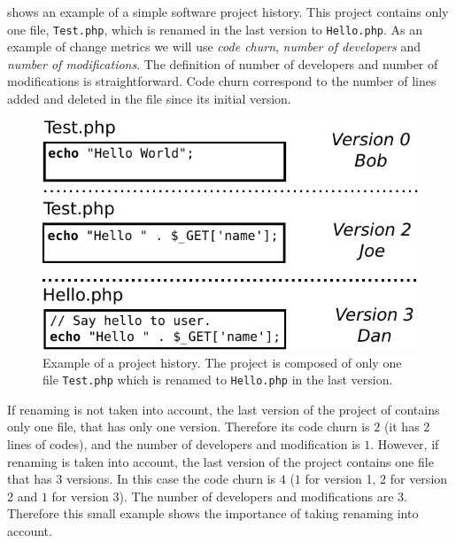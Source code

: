  shows an example of a simple software project history. This project contains only one file, \texttt{Test.php}, which is renamed in the last version to \texttt{Hello.php}. As an example of change metrics we will use \emph{code churn}, \emph{number of developers} and \emph{number of modifications}. The definition of number of developers and number of modifications is straightforward. Code churn correspond to the number of lines added and deleted in the file since its initial version.

\begin{figure}[t]
	\centering
	\includegraphics[width=1\linewidth,keepaspectratio]{data/figures/example.pdf}
	\caption{Example of a project history. The project is composed of only one file \texttt{Test.php} which is renamed to \texttt{Hello.php} in the last version.}
	\label{fig:example}
\end{figure}

If renaming is not taken into account, the last version of the project of  contains only one file, that has only one version. Therefore its code churn is $2$ (it has 2 lines of codes), and the number of developers and modification is $1$. However, if renaming is taken into account, the last version of the project contains one file that has $3$ versions. In this case the code churn is $4$ ($1$ for version 1, $2$ for version 2 and $1$ for version $3$). The number of developers and modifications are $3$. Therefore this small example shows the importance of taking renaming into account.